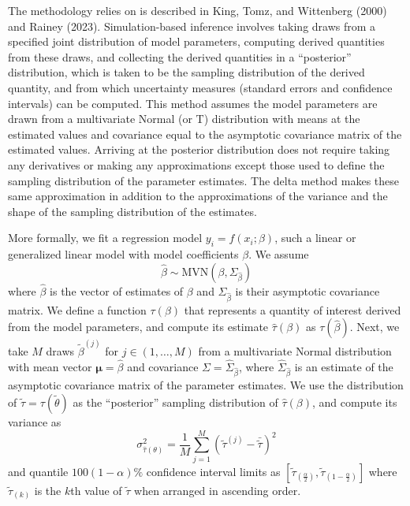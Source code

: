 The methodology  relies on is described in King, Tomz, and Wittenberg (2000) and Rainey (2023). Simulation-based inference involves taking draws from a specified joint distribution of model parameters, computing derived quantities from these draws, and collecting the derived quantities in a ``posterior'' distribution, which is taken to be the sampling distribution of the derived quantity, and from which uncertainty measures (standard errors and confidence intervals) can be computed. This method assumes the model parameters are drawn from a multivariate Normal (or T) distribution with means at the estimated values and covariance equal to the asymptotic covariance matrix of the estimated values. Arriving at the posterior distribution does not require taking any derivatives or making any approximations except those used to define the sampling distribution of the parameter estimates. The delta method makes these same approximation in addition to the approximations of the variance and the shape of the sampling distribution of the estimates.

More formally, we fit a regression model \(y_i = f(x_i; \beta)\), such a linear or generalized linear model with model coefficients \(\beta\). We assume\[
\hat{\beta} \sim \text{MVN}(\beta, \Sigma_{\hat{\beta}})
\]where \(\hat{\beta}\) is the vector of estimates of \(\beta\) and \(\Sigma_{\hat{\beta}}\) is their asymptotic covariance matrix. We define a function \(\tau(\beta)\) that represents a quantity of interest derived from the model parameters, and compute its estimate \(\hat{\tau}(\beta)\) as \(\tau(\hat{\beta})\). Next, we take \(M\) draws \(\tilde{\beta}^{(j)}\) for \(j\in(1, \dots, M)\) from a multivariate Normal distribution with mean vector \(\boldsymbol{\mu} = \hat{\beta}\) and covariance \(\Sigma = \hat{\Sigma}_{\hat{\beta}}\), where \(\hat{\Sigma}_{\hat{\beta}}\) is an estimate of the asymptotic covariance matrix of the parameter estimates. We use the distribution of \(\tilde{\tau}=\tau(\tilde{\theta})\) as the ``posterior'' sampling distribution of \(\hat{\tau}(\beta)\), and compute its variance as\[
\sigma^2_{\hat{\tau}(\theta)} = \frac{1}{M}\sum^M_{j=1}{(\tilde{\tau}^{(j)} - \bar{\tilde{\tau}})^2}
\]and quantile \(100(1-\alpha)\%\) confidence interval limits as \(\left[\tilde{\tau}_{(\frac{\alpha}{2})}, \tilde{\tau}_{(1-\frac{\alpha}{2})}\right]\) where \(\tilde{\tau}_{(k)}\) is the \(k\)th value of \(\tilde{\tau}\) when arranged in ascending order.

